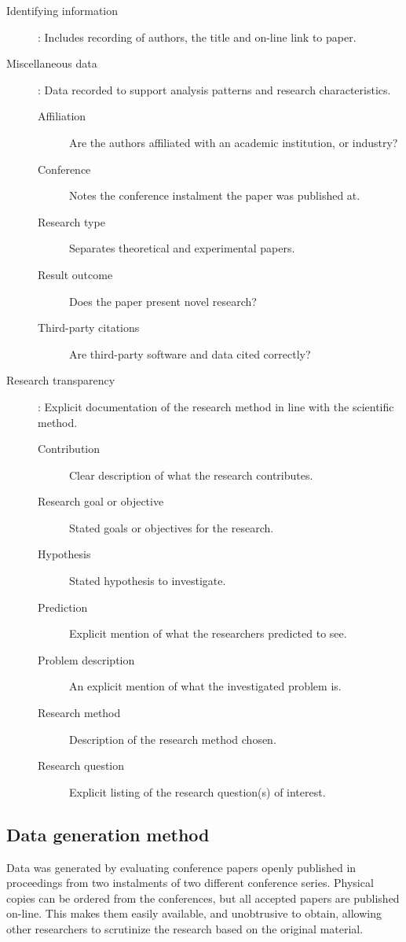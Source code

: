 \begin{description}
\item[Identifying information]: Includes recording of authors, the title and on-line link to paper.
\item[Miscellaneous data]: Data recorded to support analysis patterns and research characteristics.
    \begin{description}
    \item[Affiliation] Are the authors affiliated with an academic institution, or industry?
    \item[Conference] Notes the conference instalment the paper was published at.
    \item[Research type] Separates theoretical and experimental papers.
    \item[Result outcome] Does the paper present novel research?
    \item[Third-party citations] Are third-party software and data cited correctly?
    \end{description}
\item[Research transparency]: Explicit documentation of the research method in line with the scientific method.
    \begin{description}
    \item[Contribution] Clear description of what the research contributes.
    \item[Research goal or objective] Stated goals or objectives for the research.
    \item[Hypothesis] Stated hypothesis to investigate.
    \item[Prediction] Explicit mention of what the researchers predicted to see.
    \item[Problem description] An explicit mention of what the investigated problem is.
    \item[Research method] Description of the research method chosen.
    \item[Research question] Explicit listing of the research question(s) of interest.
    \end{description}
\end{description}

\subsection{Data generation method}
\label{sec:data-generation}
Data was generated by evaluating conference papers openly published in proceedings from two instalments of two different conference series. Physical copies can be ordered from the conferences, but all accepted papers are published on-line. This makes them easily available, and unobtrusive to obtain, allowing other researchers to scrutinize the research based on the original material.

